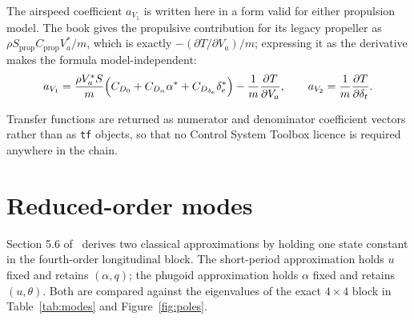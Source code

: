 \documentclass[11pt,a4paper]{article}
\newcommand{\dt}{\delta_t}
\newcommand{\de}{\delta_e}
\begin{document}
The airspeed coefficient $a_{V_1}$ is written here in a form valid for either
propulsion model. The book gives the propulsive contribution for its legacy
propeller as $\rho S_{\mathrm{prop}} C_{\mathrm{prop}} V_a^*/m$, which is exactly
$-(\partial T/\partial V_a)/m$; expressing it as the derivative makes the formula
model-independent:
\begin{equation}
  a_{V_1} = \frac{\rho V_a^* S}{m}
            \Bigl(C_{D_0} + C_{D_\alpha}\alpha^* + C_{D_{\de}}\de^*\Bigr)
          - \frac{1}{m}\frac{\partial T}{\partial V_a},
  \qquad
  a_{V_2} = \frac{1}{m}\frac{\partial T}{\partial \dt}.
  \label{eq:aV}
\end{equation}

\begin{table}[htbp]
\centering

\caption{Transfer function coefficients at $V_a^*=25\,\mathrm{m/s}$. The reference
column is from the published values of the companion code, which exist for the
Aerosonde only. Reference entries are blank for $a_{V_1}$ and $a_{V_2}$ because
those depend on the trim point, and the published trim point is not an
equilibrium; they are compared separately in Section~\ref{sec:verif}.}
\label{tab:coef}
\end{table}

Transfer functions are returned as numerator and denominator coefficient vectors
rather than as \texttt{tf} objects, so that no Control System Toolbox licence is
required anywhere in the chain.

\section{Reduced-order modes}\label{sec:modes}

Section 5.6 of~\cite{beard} derives two classical approximations by holding one
state constant in the fourth-order longitudinal block. The short-period
approximation holds $u$ fixed and retains $(\alpha,q)$; the phugoid approximation
holds $\alpha$ fixed and retains $(u,\theta)$. Both are compared against the
eigenvalues of the exact $4\times4$ block in Table~\ref{tab:modes} and
Figure~\ref{fig:poles}.

\begin{table}[htbp]
\centering

\caption{Short-period and phugoid modes, exact eigenvalues against the
section 5.6 approximations.}
\label{tab:modes}
\end{table}
\end{document}
